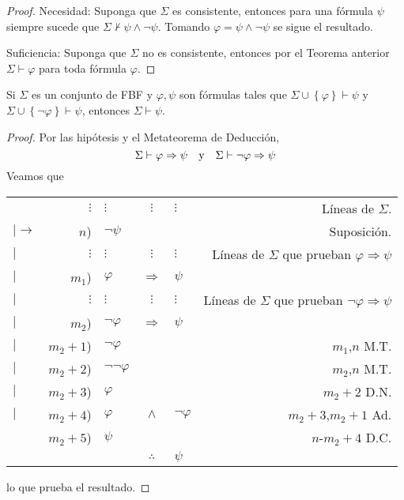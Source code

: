 \documentclass[12pt]{report}
\theoremstyle{largebreak}
\begin{document}
    \begin{proof}
        Necesidad: Suponga que $\Sigma$ es consistente, entonces para una fórmula $\psi$ siempre sucede que $\Sigma\nvdash\psi\land\neg\psi$. Tomando $\varphi=\psi\land\neg\psi$ se sigue el resultado.

        Suficiencia: Suponga que $\Sigma$ no es consistente, entonces por el Teorema anterior $\Sigma\vdash\varphi$ para toda fórmula $\varphi$.
    \end{proof}

    \begin{lema}
        \label{demPorCas}
        Si $\Sigma$ es un conjunto de FBF y $\varphi,\psi$ son fórmulas tales que $\Sigma\cup\left\{\varphi\right\}\vdash\psi$ y $\Sigma\cup\left\{\neg\varphi\right\}\vdash\psi$, entonces $\Sigma\vdash\psi$.
    \end{lema}

    \begin{proof}
        Por las hipótesis y el Metateorema de Deducción,
        \begin{equation*}
            \Sigma\vdash\varphi\Rightarrow\psi\quad\textup{y}\quad \Sigma\vdash\neg\varphi\Rightarrow\psi
        \end{equation*}
        Veamos que
        \begin{center}
            \begin{tabular}{l r l c l r}
                & $\vdots$ & $\vdots$ & $\vdots$ & $\vdots$ & Líneas de $\Sigma$. \\
                $|\longrightarrow$ & $n$) & $\neg\psi$ &  &  & Suposición. \\
                $|$ & $\vdots$ & $\vdots$ & $\vdots$ & $\vdots$ & Líneas de $\Sigma$ que prueban $\varphi\Rightarrow\psi$ \\
                $|$ & $m_1$) & $\varphi$ & $\Rightarrow$ & $\psi$ &  \\
                $|$ & $\vdots$ & $\vdots$ & $\vdots$ & $\vdots$ & Líneas de $\Sigma$ que prueban $\neg\varphi\Rightarrow\psi$ \\
                $|$ & $m_2$) & $\neg\varphi$ & $\Rightarrow$ & $\psi$ &  \\
                $|$ & $m_2+1$) & $\neg\varphi$ &  &  & $m_1$,$n$ M.T. \\
                $|$ & $m_2+2$) & $\neg\neg\varphi$ &  &  & $m_2$,$n$ M.T. \\
                $|$ & $m_2+3$) & $\varphi$ &  &  & $m_2+2$ D.N. \\
                $|$ & $m_2+4$) & $\varphi$ & $\land$ & $\neg\varphi$ & $m_2+3$,$m_2+1$ Ad. \\
                \hline
                & $m_2+5$) & $\psi$ &  &  & $n$-$m_2+4$ D.C. \\
                \hline
                & & & $\therefore$ & $\psi$ & \\
            \end{tabular}
        \end{center}
        lo que prueba el resultado.
    \end{proof}
\end{document}
